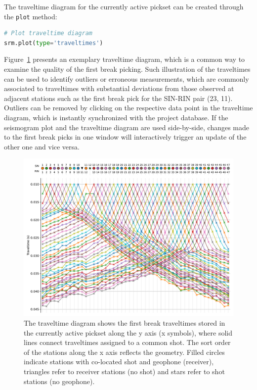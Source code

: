 \documentclass[a4paper,fleqn]{cas-sc}
\begin{document}
The traveltime diagram for the currently active pickset can be created through the \texttt{plot} method:
\begin{lstlisting}[language=Python, firstnumber=20]
# Plot traveltime diagram
srm.plot(type='traveltimes')
\end{lstlisting}
Figure~\ref{fig:traveltimes_intro} presents an exemplary traveltime diagram, which is a common way to examine the quality of the first break picking. Such illustration of the traveltimes can be used to identify outliers or erroneous measurements, which are commonly associated to traveltimes with substantial deviations from those observed at adjacent stations such as the first break pick for the SIN-RIN pair (23, 11). Outliers can be removed by clicking on the respective data point in the traveltime diagram, which is instantly synchronized with the project database. If the seismogram plot and the traveltime diagram are used side-by-side, changes made to the first break picks in one window will interactively trigger an update of the other one and vice versa.
\begin{figure}
	\centering
	\includegraphics[width=.75\textwidth]{figures/traveltimes_syn.pdf}
	\caption{The traveltime diagram shows the first break traveltimes stored in the currently active pickset along the y axis (x symbols), where solid lines connect traveltimes assigned to a common shot. The sort order of the stations along the x axis reflects the geometry. Filled circles indicate stations with co-located shot and geophone (receiver), triangles refer to receiver stations (no shot) and stars refer to shot stations (no geophone).}
	\label{fig:traveltimes_intro}
\end{figure}
\end{document}
